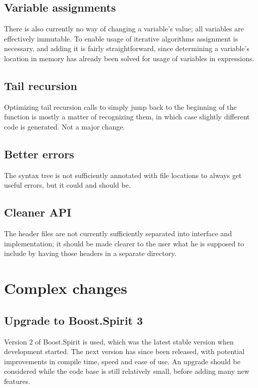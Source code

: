 		\subsection{Variable assignments}
		
		There is also currently no way of changing a variable's value; all variables are effectively immutable. To enable usage of iterative algorithms assignment is necessary, and adding it is fairly straightforward, since determining a variable's location in memory has already been solved for usage of variables in expressions.
		
		\subsection{Tail recursion}
		
		Optimizing tail recursion calls to simply jump back to the beginning of the function is mostly a matter of recognizing them, in which case slightly different code is generated. Not a major change.
		
		\subsection{Better errors}
		
		The syntax tree is not sufficiently annotated with file locations to always get useful errors, but it could and should be.
		
		\subsection{Cleaner API}
		
		The header files are not currently sufficiently separated into interface and implementation; it should be made clearer to the user what he is supposed to include by having those headers in a separate directory.
	
	\section{Complex changes}
		
		\subsection{Upgrade to Boost.Spirit 3}
		
		Version 2 of Boost.Spirit is used, which was the latest stable version when development started. The next version has since been released, with potential improvements in compile time, speed and ease of use. An upgrade should be considered while the code base is still relatively small, before adding many new features.
		
